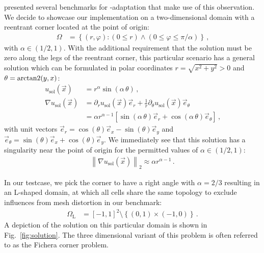 \textcite{mitchell2014} presented several benchmarks for \hp-adaptation that make use of this observation. We decide to showcase our implementation on a two-dimensional domain with a reentrant corner located at the point of origin:
\begin{align}
\Omega &= \left\{ (r,\varphi) : (0 \leq r) \wedge( 0 \leq \varphi \leq \pi/\alpha) \right\} \,\text{,}
\end{align}
with $\alpha \in \left(1/2, 1\right)$. With the additional requirement that the solution must be zero along the legs of the reentrant corner, this particular scenario has a general solution which can be formulated in polar coordinates $r = \sqrt{x^2 + y^2} > 0$ and $\theta = \operatorname{arctan2}(y,x)$:
\begin{align}
u_\text{sol}(\vec{x}) &= r^\alpha \sin(\alpha \, \theta) \,\text{,} \\
\nonumber \nabla u_\text{sol}(\vec{x}) &= \partial_r u_\text{sol}(\vec{x}) \vec{e}_r + \frac{1}{r} \partial_\theta u_\text{sol}(\vec{x}) \vec{e}_\theta \\
&= \alpha r^{\alpha - 1} \left[ \sin(\alpha \, \theta) \vec{e}_r + \cos(\alpha \, \theta) \vec{e}_\theta \right] \,\text{,}
\end{align}
with unit vectors \(\vec{e}_r = \cos(\theta) \vec{e}_x - \sin(\theta) \vec{e}_y\) and \(\vec{e}_\theta = \sin(\theta) \vec{e}_x + \cos(\theta) \vec{e}_y\). We immediately see that this solution has a singularity near the point of origin for the permitted values of $\alpha \in \left(1/2, 1\right)$:
\begin{align}
\left\| \nabla u_\text{sol}(\vec{x}) \right\|_{2} \approx \alpha r^{\alpha - 1} \,\text{.}
\end{align}

In our testcase, we pick the corner to have a right angle with $\alpha = 2/3$ resulting in an L-shaped domain, at which all cells share the same topology to exclude influences from mesh distortion in our benchmark:
\begin{align}
\Omega_\text{L} &= \left[-1,1\right]^2 \setminus \left\{ \left(0,1\right) \times \left(-1, 0\right) \right\} \,\text{.}
\end{align}
A depiction of the solution on this particular domain is shown in Fig.~\ref{fig:solution}. The three dimensional variant of this problem is often referred to as the Fichera corner problem.

